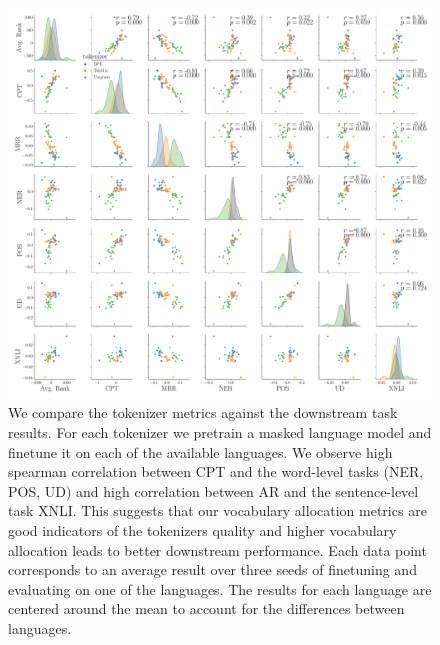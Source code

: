 \begin{figure}[H]
    \centering
    \includegraphics[width=\textwidth]{paper/figures/pair_analysis_20L.pdf}
    \caption{We compare the tokenizer metrics against the downstream task results. For each tokenizer we pretrain a masked language model and finetune it on each of the available languages. We observe high spearman correlation between CPT and the word-level tasks (NER, POS, UD) and high correlation between AR and the sentence-level task XNLI. This suggests that our vocabulary allocation metrics are good indicators of the tokenizers quality and higher vocabulary allocation leads to better downstream performance. Each data point corresponds to an average result over three seeds of finetuning and evaluating on one of the languages. The results for each language are centered around the mean to account for the differences between languages.}
    \label{fig:pair_analysis_20L}
\end{figure}

